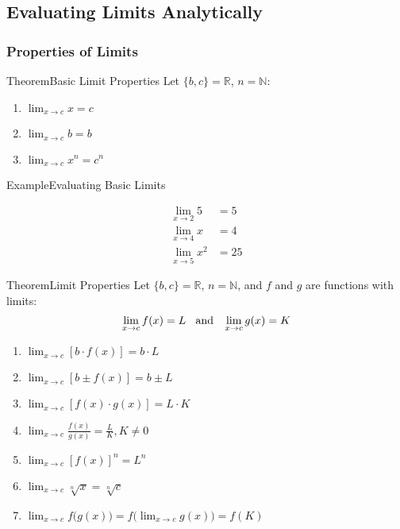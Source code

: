 \documentclass{MathNotes}
\newenvironment{example}[1]{\begin{BlueBox}{Example}{#1}}{\end{BlueBox}}
\newenvironment{theorem}[1]{\begin{GrayBox}{Theorem}{#1}}{\end{GrayBox}}
\begin{document}
\subsection{Evaluating Limits Analytically}

\subsubsection{Properties of Limits}

\begin{multicols}{2}[]
	\begin{theorem}{Basic Limit Properties}
		Let $\{b, c\}=\mathbb{R}$, $n=\mathbb{N}$:

		\begin{enumerate}
			\item $\lim_{x\to c}x=c$
			\item $\lim_{x\to c}b=b$
			\item $\lim_{x\to c}x^n=c^n$
		\end{enumerate}
	\end{theorem}

	\begin{example}{Evaluating Basic Limits}
		\begin{center}
			\begin{align*}
				\lim_{x\to 2}5   & =5  \\
				\lim_{x\to 4}x   & =4  \\
				\lim_{x\to 5}x^2 & =25
			\end{align*}
		\end{center}
	\end{example}
\end{multicols}

\newpage
{}
\begin{theorem}{Limit Properties}
	Let $\{b, c\}=\mathbb{R}$, $n=\mathbb{N}$, and $f$ and $g$ are functions
	with limits:
	\begin{displaymath}
		\lim_{x\to c}f(x)=L\hspace{2ex}\text{and}\hspace{2ex}\lim_{x\to c}g(x)=K
	\end{displaymath}

	\begin{enumerate}
		\item $\lim_{x\to c}[ b\cdot f(x) ]=b\cdot L$
		\item $\lim_{x\to c}[ b\pm f(x) ]=b\pm L$
		\item $\lim_{x\to c}[ f(x)\cdot g(x) ]=L\cdot K$
		\item $\lim_{x\to c}\frac{f(x)}{g(x)}=\frac{L}{K}, K\neq 0$
		\item $\lim_{x\to c}[ f(x)] ^n=L^n$
		\item $\lim_{x\to c}\sqrt[n]x=\sqrt[n]{c}$
		\item $\lim_{x\to c}f\bigl(g(x)\bigr)=f\bigl(\lim_{x\to c}g(x)\bigr)=f(K)$
	\end{enumerate}
\end{theorem}
\end{document}
